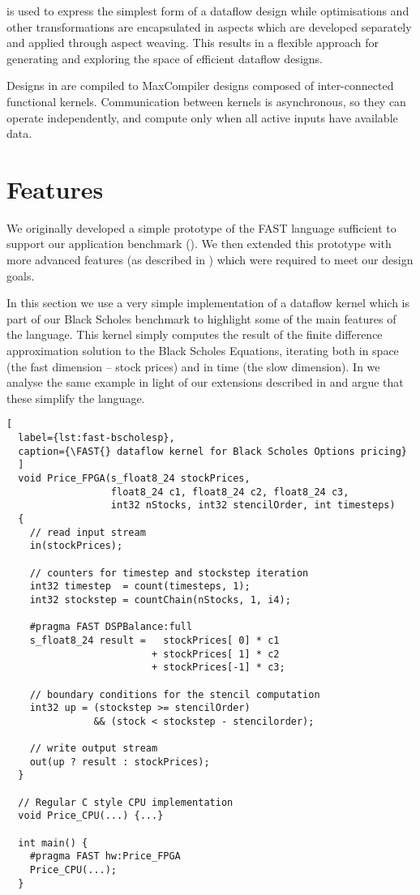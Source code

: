 \FAST{} is used to express the simplest form of a dataflow design
while optimisations and other transformations are encapsulated in
aspects which are developed separately and applied through aspect
weaving. This results in a flexible approach for generating and
exploring the space of efficient dataflow designs.

Designs in \FAST{} are compiled to MaxCompiler designs composed of
inter-connected functional kernels. Communication between kernels is
asynchronous, so they can operate independently, and compute only when
all active inputs have available data.

\section{Features}

We originally developed a simple prototype of the FAST language
sufficient to support our application benchmark
(). We then extended this prototype with more
advanced features (as described in ) which
were required to meet our design goals.

In this section we use a very simple implementation of a dataflow
kernel which is part of our Black Scholes benchmark to highlight some
of the main features of the \FAST{} language. This kernel simply
computes the result of the finite difference approximation solution to
the Black Scholes Equations, iterating both in space (the fast
dimension -- stock prices) and in time (the slow dimension). In
 we analyse the same example in light of our
extensions described in  and argue that
these simplify the language.

\lstset{style=MaxC}

\begin{lstlisting}[
  label={lst:fast-bscholesp},
  caption={\FAST{} dataflow kernel for Black Scholes Options pricing}
  ]
  void Price_FPGA(s_float8_24 stockPrices,
                  float8_24 c1, float8_24 c2, float8_24 c3,
                  int32 nStocks, int32 stencilOrder, int timesteps)
  {
    // read input stream
    in(stockPrices);

    // counters for timestep and stockstep iteration
    int32 timestep  = count(timesteps, 1);
    int32 stockstep = countChain(nStocks, 1, i4);

    #pragma FAST DSPBalance:full
    s_float8_24 result =   stockPrices[ 0] * c1
                         + stockPrices[ 1] * c2
                         + stockPrices[-1] * c3;

    // boundary conditions for the stencil computation
    int32 up = (stockstep >= stencilOrder)
               && (stock < stockstep - stencilorder);

    // write output stream
    out(up ? result : stockPrices);
  }

  // Regular C style CPU implementation
  void Price_CPU(...) {...}

  int main() {
    #pragma FAST hw:Price_FPGA
    Price_CPU(...);
  }
\end{lstlisting}

